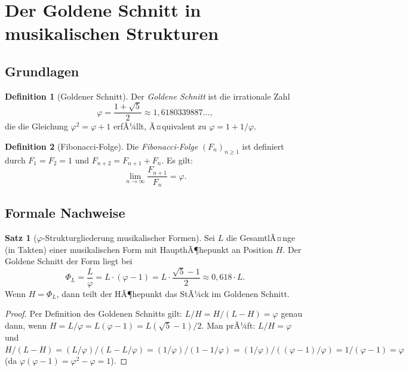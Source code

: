﻿\documentclass[a4paper,12pt]{article}
\theoremstyle{definition}
\newtheorem{definition}{Definition}
\newtheorem{satz}{Satz}
\begin{document}
\section{Der Goldene Schnitt in musikalischen Strukturen}

\subsection{Grundlagen}

\begin{definition}[Goldener Schnitt]
Der \emph{Goldene Schnitt} ist die irrationale Zahl
\[
\varphi = \frac{1 + \sqrt{5}}{2} \approx 1{,}6180339887\ldots,
\]
die die Gleichung $\varphi^2 = \varphi + 1$ erfÃ¼llt, Ã¤quivalent zu
$\varphi = 1 + 1/\varphi$.
\end{definition}

\begin{definition}[Fibonacci-Folge]
Die \emph{Fibonacci-Folge} $(F_n)_{n \geq 1}$ ist definiert durch
$F_1 = F_2 = 1$ und $F_{n+2} = F_{n+1} + F_n$. Es gilt:
\[
\lim_{n \to \infty} \frac{F_{n+1}}{F_n} = \varphi.
\]
\end{definition}

\subsection{Formale Nachweise}

\begin{satz}[$\varphi$-Strukturgliederung musikalischer Formen]
\label{satz:phi_form}
Sei $L$ die GesamtlÃ¤nge (in Takten) einer musikalischen Form mit HaupthÃ¶hepunkt
an Position $H$. Der Goldene Schnitt der Form liegt bei
\[
\Phi_L = \frac{L}{\varphi} = L \cdot (\varphi - 1) = L \cdot \frac{\sqrt{5}-1}{2} \approx 0{,}618 \cdot L.
\]
Wenn $H = \Phi_L$, dann teilt der HÃ¶hepunkt das StÃ¼ck im Goldenen Schnitt.
\end{satz}

\begin{proof}
Per Definition des Goldenen Schnitts gilt: $L/H = H/(L-H) = \varphi$
genau dann, wenn $H = L/\varphi = L(\varphi-1) = L(\sqrt{5}-1)/2$.
Man prÃ¼ft: $L/H = \varphi$ und $H/(L-H) = (L/\varphi)/(L-L/\varphi)
= (1/\varphi)/(1-1/\varphi) = (1/\varphi)/(({\varphi-1})/\varphi)
= 1/(\varphi-1) = \varphi$ (da $\varphi(\varphi-1) = \varphi^2-\varphi = 1$).
\end{proof}
\end{document}
